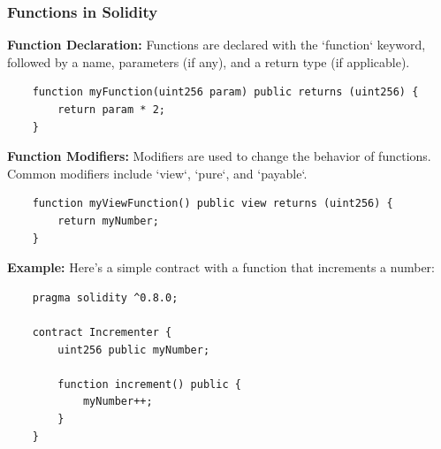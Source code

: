 \documentclass[12pt, a4paper]{article}
\begin{document}
\subsubsection{Functions in Solidity}
\textbf{Function Declaration:}
Functions are declared with the `function` keyword, followed by a name, parameters (if any), and a return type (if applicable).
\begin{verbatim}
    function myFunction(uint256 param) public returns (uint256) {
        return param * 2;
    }
\end{verbatim}
\textbf{Function Modifiers:}
Modifiers are used to change the behavior of functions. Common modifiers include `view`, `pure`, and `payable`.
\begin{verbatim}
    function myViewFunction() public view returns (uint256) {
        return myNumber;
    }
\end{verbatim}
\textbf{Example:}
Here’s a simple contract with a function that increments a number:
\begin{verbatim}
    pragma solidity ^0.8.0;

    contract Incrementer {
        uint256 public myNumber;

        function increment() public {
            myNumber++;
        }
    }
\end{verbatim}
\end{document}
